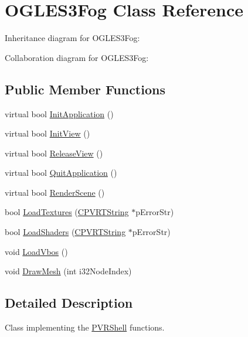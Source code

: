\hypertarget{class_o_g_l_e_s3_fog}{\section{O\+G\+L\+E\+S3\+Fog Class Reference}
\label{class_o_g_l_e_s3_fog}
}


Inheritance diagram for O\+G\+L\+E\+S3\+Fog\+:


Collaboration diagram for O\+G\+L\+E\+S3\+Fog\+:
\subsection*{Public Member Functions}
\begin{DoxyCompactItemize}
\item 
virtual bool \hyperlink{class_o_g_l_e_s3_fog_a099dabe90353f7bd8f97ee1730fe782c}{Init\+Application} ()
\item 
virtual bool \hyperlink{class_o_g_l_e_s3_fog_ac0febbbca454858961fd79896f1afefa}{Init\+View} ()
\item 
virtual bool \hyperlink{class_o_g_l_e_s3_fog_a1ccd71ae3752c5795ebdbc4ab831945a}{Release\+View} ()
\item 
virtual bool \hyperlink{class_o_g_l_e_s3_fog_a457948af4da444ad671a98f76a17f5a5}{Quit\+Application} ()
\item 
virtual bool \hyperlink{class_o_g_l_e_s3_fog_a54874a48306ebed1b5962fb05584adb9}{Render\+Scene} ()
\item 
bool \hyperlink{class_o_g_l_e_s3_fog_af5d4f8c6de72bd06280a8e0a887e2e1c}{Load\+Textures} (\hyperlink{class_c_p_v_r_t_string}{C\+P\+V\+R\+T\+String} $\ast$p\+Error\+Str)
\item 
bool \hyperlink{class_o_g_l_e_s3_fog_a25b171f88293a9c057a8672efb37b5f3}{Load\+Shaders} (\hyperlink{class_c_p_v_r_t_string}{C\+P\+V\+R\+T\+String} $\ast$p\+Error\+Str)
\item 
void \hyperlink{class_o_g_l_e_s3_fog_a93570c76149028b474b068ce5b7c8f47}{Load\+Vbos} ()
\item 
void \hyperlink{class_o_g_l_e_s3_fog_aae9e3e5aa075f030b1d15e84fe8a9b5d}{Draw\+Mesh} (int i32\+Node\+Index)
\end{DoxyCompactItemize}


\subsection{Detailed Description}


 Class implementing the \hyperlink{class_p_v_r_shell}{P\+V\+R\+Shell} functions. 

